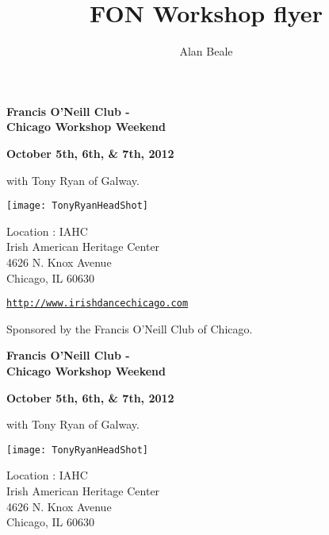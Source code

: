 \documentclass[10pt,
lettterpaper]{leaflet}
\title{FON Workshop flyer}
\author{Alan Beale}
\date{}
\begin{document}

\pagebreak

\pagebreak

\pagebreak
\begin{center}
{\Large\textbf{Francis O'Neill Club - \\ Chicago Workshop Weekend}}\\ 
\end{center}

\begin{center}
\textbf{October 5th, 6th, \&  7th, 2012} 
\end{center}

\vspace*{0.25em}
with Tony Ryan of Galway.

\vspace*{0.45em}
\begin{center}
\texttt{[image: TonyRyanHeadShot]}
\end{center}

\vspace*{2.5em}
Location : IAHC\\
Irish American Heritage Center\\
4626 N. Knox Avenue\\
Chicago, IL  60630 

\vspace*{2em}
\href{http://www.irishdancechicago.com}{\tt http://www.irishdancechicago.com} 

{\small Sponsored by the Francis O'Neill Club of Chicago.}

\pagebreak
\begin{center}
{\Large\textbf{Francis O'Neill Club - \\ Chicago Workshop Weekend}}\\ 
\end{center}

\begin{center}
\textbf{October 5th, 6th, \&  7th, 2012} 
\end{center}

\vspace*{0.25em}
with Tony Ryan of Galway.

\vspace*{0.45em}
\begin{center}
\texttt{[image: TonyRyanHeadShot]}
\end{center}

\vspace*{2.5em}
Location : IAHC\\
Irish American Heritage Center\\
4626 N. Knox Avenue\\
Chicago, IL  60630 
\end{document}
